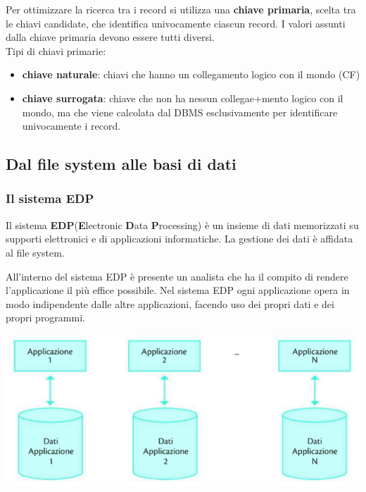 \documentclass{article}
\begin{document}
Per ottimizzare la ricerca tra i record si utilizza una \textbf{chiave primaria}, scelta tra le chiavi candidate, che identifica univocamente ciascun record. I valori assunti dalla chiave primaria devono essere tutti diversi.
\\
Tipi di chiavi primarie:
\begin{itemize}
    \item \textbf{chiave naturale}: chiavi che hanno un collegamento logico con il mondo (CF)
    \item \textbf{chiave surrogata}: chiave che non ha nessun collegae+mento logico con il mondo, ma che viene calcolata dal DBMS esclusivamente per identificare univocamente i record.
\end{itemize}

\subsection{Dal file system alle basi di dati}
\subsubsection{Il sistema EDP}
Il sistema \textbf{EDP}(\textbf{E}lectronic \textbf{D}ata \textbf{P}rocessing) è un insieme di dati memorizzati su supporti elettronici e di applicazioni informatiche.
La gestione dei dati è affidata al file system.

All'interno del sistema EDP è presente un analista che ha il compito di rendere l'applicazione il più effice possibile. Nel sistema EDP ogni applicazione opera in modo indipendente dalle altre applicazioni, facendo uso dei propri dati e dei propri programmi.

\begin{center}
    
\includegraphics[h, scale=1]{edp.PNG}

\end{center}%
\end{document}

